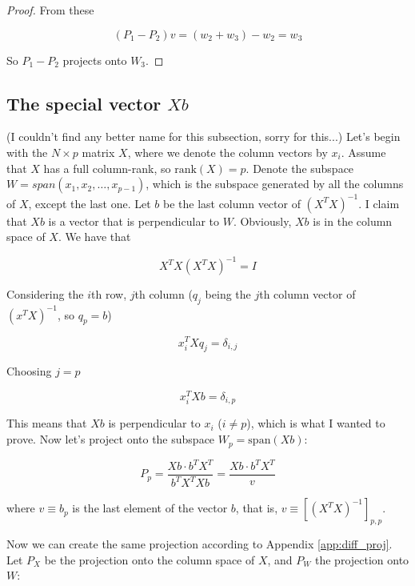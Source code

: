 \documentclass{article}
\begin{document}
\begin{appendices}
\begin{proof}
From these

\begin{equation}
    (P_1 - P_2) v = (w_2 + w_3) - w_2 = w_3
\end{equation}

So $P_1 - P_2$ projects onto $W_3$.

\end{proof}

\subsection{The special vector $Xb$} \label{app:spec_Xb}

(I couldn't find any better name for this subsection, sorry for this...) Let's begin with the $N\times p$ matrix $X$, where we denote the column vectors by $x_i$. Assume that $X$ has a full column-rank, so $\text{rank}(X)=p$. Denote the subspace $W = span(x_1, x_2, \dots, x_{p-1})$, which is the subspace generated by all the columns of $X$, except the last one. Let $b$ be the last column vector of $(X^TX)^{-1}$. I claim that $Xb$ is a vector that is perpendicular to $W$. Obviously, $Xb$ is in the column space of $X$. We have that

\begin{equation}
    X^TX(X^TX)^{-1} = I
\end{equation}

Considering the $i$th row, $j$th column ($q_j$ being the $j$th column vector of $(x^TX)^{-1}$, so $q_p = b$)

\begin{equation}
    x^T_i X q_j = \delta_{i,j}
\end{equation}

Choosing $j=p$

\begin{equation}
    x^T_i X b = \delta_{i,p}
\end{equation}

This means that $Xb$ is perpendicular to $x_i$ ($i \neq p$), which is what I wanted to prove. Now let's project onto the subspace $W_p = \text{span}(Xb)$:

\begin{equation}
    P_{p} = \frac{Xb\cdot b^TX^T}{b^TX^TXb} = \frac{Xb\cdot b^TX^T}{v}
\end{equation}

where $v \equiv b_p$ is the last element of the vector $b$, that is, $v\equiv [(X^TX)^{-1}]_{p,p}$.

Now we can create the same projection according to Appendix \ref{app:diff_proj}. Let $P_X$ be the projection onto the column space of $X$, and $P_W$ the projection onto $W$:


\end{appendices}
\end{document}
